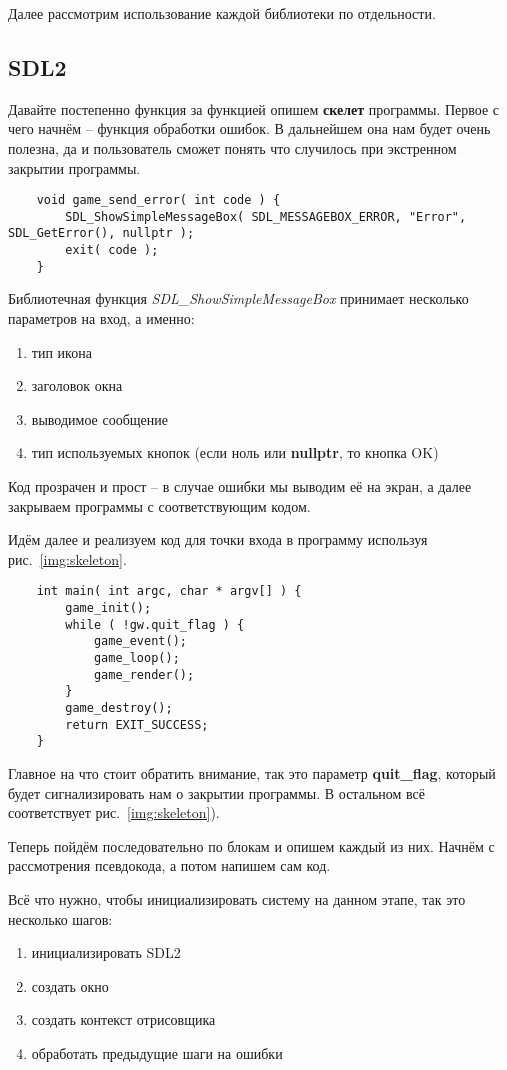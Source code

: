 Далее рассмотрим использование каждой библиотеки по отдельности.

\subsection{SDL2}
Давайте постепенно функция за функцией опишем \textbf{скелет} программы. Первое с чего начнём -- функция 
обработки ошибок. В дальнейшем она нам будет очень полезна, да и пользователь сможет понять что случилось при 
экстренном закрытии программы.

\begin{lstlisting}
    void game_send_error( int code ) {
        SDL_ShowSimpleMessageBox( SDL_MESSAGEBOX_ERROR, "Error", SDL_GetError(), nullptr );
        exit( code );
    }
\end{lstlisting}

Библиотечная функция \emph{SDL\_ShowSimpleMessageBox} принимает несколько параметров на вход, а именно:
\begin{enumerate}
    \item тип икона
    \item заголовок окна
    \item выводимое сообщение
    \item тип используемых кнопок (если ноль или \textbf{nullptr}, то кнопка OK)
\end{enumerate}

Код прозрачен и прост -- в случае ошибки мы выводим её на экран, а далее закрываем программы с 
соответствующим кодом. 

Идём далее и реализуем код для точки входа в программу используя рис.~\ref{img:skeleton}.
\begin{lstlisting}
    int main( int argc, char * argv[] ) {
        game_init();
        while ( !gw.quit_flag ) {
            game_event();
            game_loop();
            game_render();
        }
        game_destroy();
        return EXIT_SUCCESS;
    }
\end{lstlisting}

Главное на что стоит обратить внимание, так это параметр \textbf{quit\_flag}, который будет сигнализировать 
нам о закрытии программы. В остальном всё соответствует рис.~\ref{img:skeleton}).

Теперь пойдём последовательно по блокам и опишем каждый из них. Начнём с рассмотрения псевдокода, а потом 
напишем сам код.

Всё что нужно, чтобы инициализировать систему на данном этапе, так это несколько шагов:
\begin{enumerate}
    \item инициализировать SDL2
    \item создать окно
    \item создать контекст отрисовщика
    \item обработать предыдущие шаги на ошибки
\end{enumerate}

